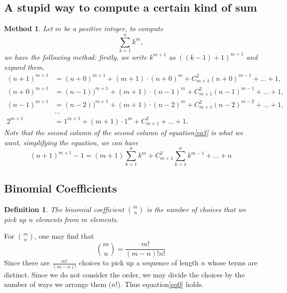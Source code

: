 \documentclass{article}
\newtheorem{method}{Method}[section]
\newtheorem{definition}{Definition}[section]
\begin{document}
\subsection{A stupid way to compute a certain kind of sum}
    \begin{method}
        Let $m$ be a positive integer, to compute 
        \begin{equation}
            \sum^n_{k=1}k^m,
        \end{equation}
        we have the following method: firstly, we write $k^{m+1}$ as $((k-1)+1)^{m+1}$ and expand them.
        \begin{equation}\label{eq3}
            \begin{split}
                (n+1)^{m+1}&=(n+0)^{m+1}+(m+1)\cdot (n+0)^m+C^2_{m+1}(n+0)^{m-1}+\ldots+1,\\
                (n+0)^{m+1}&=(n-1))^{m+1}+(m+1)\cdot(n-1)^m+C^2_{m+1}(n-1)^{m-1}+\ldots+1,\\
                (n-1)^{m+1}&=(n-2))^{m+1}+(m+1)\cdot(n-2)^m+C^2_{m+1}(n-2)^{m-2}+\ldots+1,\\
                &\ldots\\
                2^{m+1}&=1^{m+1}+(m+1)\cdot1^m+C^2_{m+1}+\ldots+1.
            \end{split}
        \end{equation}
        Note that the second column of the second column of equation\eqref{eq3} is what we want, simplifying the equation, we can have
        \begin{equation*}
            (n+1)^{m+1}-1=(m+1)\sum^n_{k=1}k^m+C^2_{m+1}\sum^n_{k=1}k^{m-1}+\ldots+n
        \end{equation*}
    \end{method}

    \subsection{Binomial Coefficients}
    \begin{definition}
        The binomial coefficient $\binom{m}{n}$ is the number of choices that we pick up $n$ elements from $m$ elements.
    \end{definition}

    For $\binom{m}{n}$, one may find that 
    \begin{equation}\label{eq0}
        \binom{m}{n}=\frac{m!}{(m-n)!n!}
    \end{equation}
    Since there are $\frac{m!}{(m-n)!}$ choices to pick up a sequence of length $n$ whose terms are distinct. Since we do not consider the order, we may divide the choices by the number of ways we arrange them ($n!$). Thus equation\eqref{eq0} holds.
\end{document}
